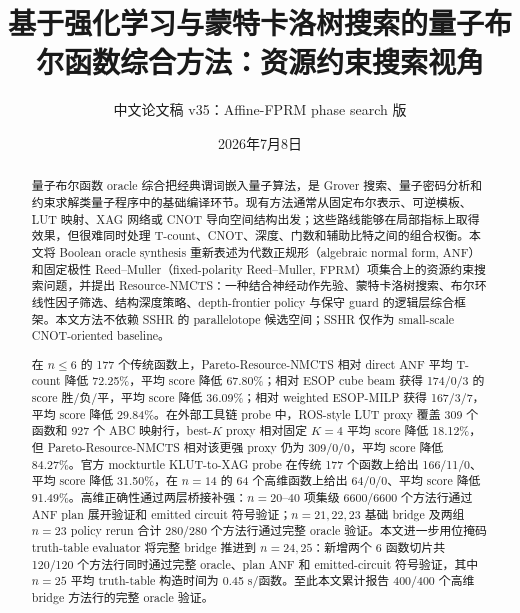 \documentclass[UTF8,fontset=macnew,11pt]{ctexart}
\title{基于强化学习与蒙特卡洛树搜索的量子布尔函数综合方法：资源约束搜索视角}
\author{中文论文稿 v35：Affine-FPRM phase search 版}
\date{2026年7月8日}
\newcommand{\method}{Resource-NMCTS}
\newcommand{\anf}{\ensuremath{\mathrm{ANF}}}
\newcommand{\fprm}{\ensuremath{\mathrm{FPRM}}}
\begin{document}
\pagestyle{plain}
\maketitle

\begin{abstract}
量子布尔函数 oracle 综合把经典谓词嵌入量子算法，是 Grover 搜索、量子密码分析和约束求解类量子程序中的基础编译环节。现有方法通常从固定布尔表示、可逆模板、LUT 映射、XAG 网络或 CNOT 导向空间结构出发；这些路线能够在局部指标上取得效果，但很难同时处理 T-count、CNOT、深度、门数和辅助比特之间的组合权衡。本文将 Boolean oracle synthesis 重新表述为代数正规形（algebraic normal form, \anf{}）和固定极性 Reed--Muller（fixed-polarity Reed--Muller, \fprm{}）项集合上的资源约束搜索问题，并提出 \method{}：一种结合神经动作先验、蒙特卡洛树搜索、布尔环线性因子筛选、结构深度策略、depth-frontier policy 与保守 guard 的逻辑层综合框架。本文方法不依赖 SSHR 的 parallelotope 候选空间；SSHR 仅作为 small-scale CNOT-oriented baseline。

在 $n\leq6$ 的 177 个传统函数上，Pareto-\method{} 相对 direct \anf{} 平均 T-count 降低 72.25\%，平均 score 降低 67.80\%；相对 ESOP cube beam 获得 174/0/3 的 score 胜/负/平，平均 score 降低 36.09\%；相对 weighted ESOP-MILP 获得 167/3/7，平均 score 降低 29.84\%。在外部工具链 probe 中，ROS-style LUT proxy 覆盖 309 个函数和 927 个 ABC 映射行，best-$K$ proxy 相对固定 $K=4$ 平均 score 降低 18.12\%，但 Pareto-\method{} 相对该更强 proxy 仍为 309/0/0，平均 score 降低 84.27\%。官方 mockturtle KLUT-to-XAG probe 在传统 177 个函数上给出 166/11/0、平均 score 降低 31.50\%，在 $n=14$ 的 64 个高维函数上给出 64/0/0、平均 score 降低 91.49\%。高维正确性通过两层桥接补强：$n=20$--$40$ 项集级 6600/6600 个方法行通过 \anf{} plan 展开验证和 emitted circuit 符号验证；$n=21,22,23$ 基础 bridge 及两组 $n=23$ policy rerun 合计 280/280 个方法行通过完整 oracle 验证。本文进一步用位掩码 truth-table evaluator 将完整 bridge 推进到 $n=24,25$：新增两个 6 函数切片共 120/120 个方法行同时通过完整 oracle、plan \anf{} 和 emitted-circuit 符号验证，其中 $n=25$ 平均 truth-table 构造时间为 0.45 s/函数。至此本文累计报告 400/400 个高维 bridge 方法行的完整 oracle 验证。


\end{abstract}
\end{document}
